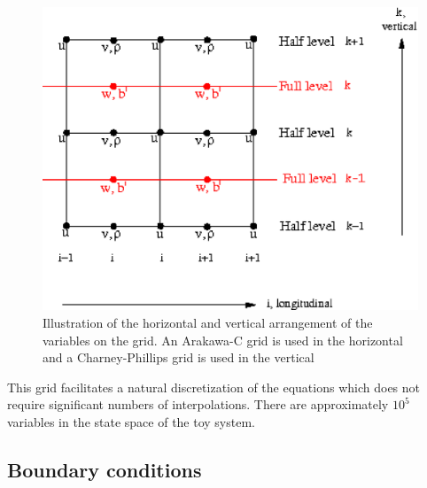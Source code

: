\documentclass[times]{qjrms4}
\begin{document}
\begin{figure}
  \begin{center}
    \includegraphics[scale=0.8]{grid1.eps}
  \end{center}
\caption{Illustration of the horizontal and vertical arrangement of the variables on the 
grid.  An Arakawa-C grid is used in the horizontal and a Charney-Phillips grid is used in the vertical}
\label{f_grid}
\end{figure}  

This grid facilitates a natural discretization of the equations which does not require significant 
numbers of interpolations.  There are approximately $10^5$ variables in the state space of the toy system.

\subsection{Boundary conditions}
\end{document}
